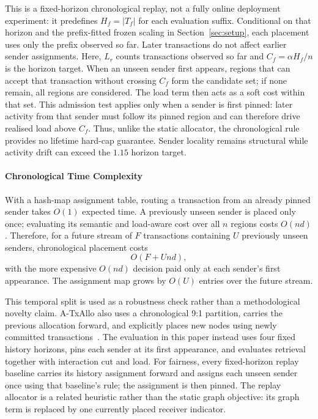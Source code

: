 \documentclass[runningheads]{llncs}
\begin{document}
This is a fixed-horizon chronological replay, not a fully
online deployment experiment: it predefines $H_f=|T_f|$ for each evaluation
suffix. Conditional on that horizon and the prefix-fitted frozen scaling in
Section~\ref{sec:setup}, each placement uses only the prefix observed so far.
Later transactions do not affect earlier sender assignments. Here, $L_r$ counts
transactions observed so far and $C_f=\alpha H_f/n$ is the horizon target. When an unseen sender first appears, regions
that can accept that transaction without crossing $C_f$ form the candidate set;
if none remain, all regions are considered. The load term then acts as a soft
cost within that set. This admission test applies only when a sender is first
pinned: later activity from that sender must follow its pinned region and can
therefore drive realised load above $C_f$. Thus, unlike the static allocator,
the chronological rule provides no lifetime hard-cap guarantee. Sender locality remains
structural while activity drift can exceed the $1.15$ horizon target.

\paragraph{Chronological Time Complexity}
With a hash-map assignment table, routing a transaction from an already pinned
sender takes $O(1)$ expected time. A previously unseen sender is placed only
once; evaluating its semantic and load-aware cost over all $n$ regions costs
$O(nd)$. Therefore, for a future stream of $F$ transactions containing $U$
previously unseen senders, chronological placement costs
\begin{equation}
\label{eq:online_complexity}
O(F+Und),
\end{equation}
with the more expensive $O(nd)$ decision paid only at each sender's first
appearance. The assignment map grows by $O(U)$ entries over the future stream.

This temporal split is used as a robustness check rather than a methodological
novelty claim. A-TxAllo also uses a chronological 9:1 partition, carries the
previous allocation forward, and explicitly places new nodes using newly
committed transactions~\cite{txallo2023}. The evaluation in this paper instead
uses four fixed history horizons, pins each sender at its first appearance, and
evaluates retrieval together with interaction cut and load.
For fairness, every fixed-horizon replay baseline carries its history assignment
forward and assigns each unseen sender once using that baseline's rule; the
assignment is then pinned. The replay allocator is a related heuristic rather than the
static graph objective: its graph term is replaced by one currently placed
receiver indicator.
\end{document}
